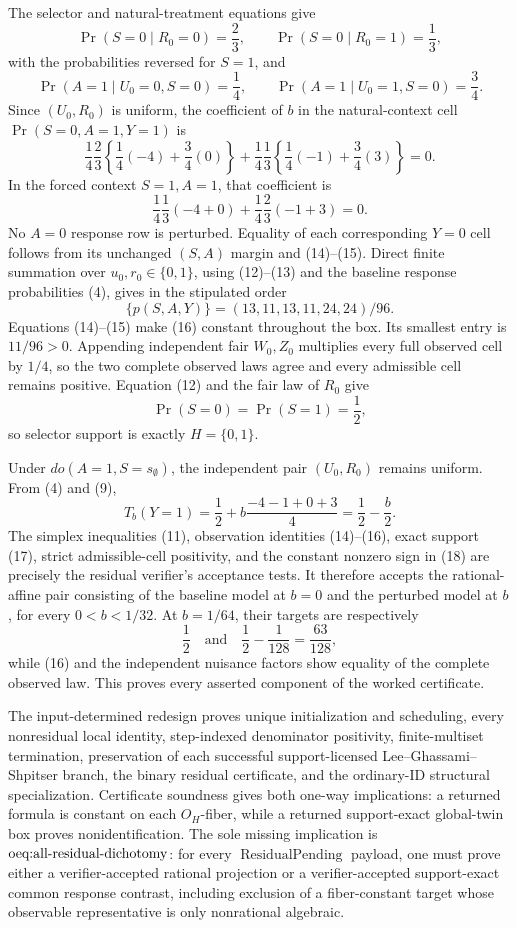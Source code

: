 The selector and natural-treatment equations give
\[
 \Pr(S=0\mid R_0=0)=\frac23,
 \qquad
 \Pr(S=0\mid R_0=1)=\frac13,
\tag{12}
\]
with the probabilities reversed for \(S=1\), and
\[
 \Pr(A=1\mid U_0=0,S=0)=\frac14,
 \qquad
 \Pr(A=1\mid U_0=1,S=0)=\frac34.
\tag{13}
\]
Since \((U_0,R_0)\) is uniform, the coefficient of \(b\) in the natural-context cell \(\Pr(S=0,A=1,Y=1)\) is
\[
 \frac14\frac23\left\{\frac14(-4)+\frac34(0)\right\}
 +\frac14\frac13\left\{\frac14(-1)+\frac34(3)\right\}=0.
\tag{14}
\]
In the forced context \(S=1,A=1\), that coefficient is
\[
 \frac14\frac13(-4+0)+\frac14\frac23(-1+3)=0.
\tag{15}
\]
No \(A=0\) response row is perturbed.  Equality of each corresponding \(Y=0\) cell follows from its unchanged \((S,A)\) margin and (14)--(15).  Direct finite summation over \(u_0,r_0\in\{0,1\}\), using (12)--(13) and the baseline response probabilities (4), gives in the stipulated order
\[
 \bigl\{p(S,A,Y)\bigr\}
 =(13,11,13,11,24,24)/96.
\tag{16}
\]
Equations (14)--(15) make (16) constant throughout the box.  Its smallest entry is \(11/96>0\).  Appending independent fair \(W_0,Z_0\) multiplies every full observed cell by \(1/4\), so the two complete observed laws agree and every admissible cell remains positive.  Equation (12) and the fair law of \(R_0\) give
\[
 \Pr(S=0)=\Pr(S=1)=\frac12,
\tag{17}
\]
so selector support is exactly \(H=\{0,1\}\).

Under \(do(A=1,S=s_{\emptyset})\), the independent pair \((U_0,R_0)\) remains uniform.  From (4) and (9),
\[
 T_b(Y=1)=\frac12+b\frac{-4-1+0+3}{4}
 =\frac12-\frac b2.
\tag{18}
\]
The simplex inequalities (11), observation identities (14)--(16), exact support (17), strict admissible-cell positivity, and the constant nonzero sign in (18) are precisely the residual verifier's acceptance tests.  It therefore accepts the rational-affine pair consisting of the baseline model at \(b=0\) and the perturbed model at \(b\), for every \(0<b<1/32\).  At \(b=1/64\), their targets are respectively
\[
 \frac12
 \quad\text{and}\quad
 \frac12-\frac1{128}=\frac{63}{128},
\tag{19}
\]
while (16) and the independent nuisance factors show equality of the complete observed law.  This proves every asserted component of the worked certificate.

The input-determined redesign proves unique initialization and scheduling, every nonresidual local identity, step-indexed denominator positivity, finite-multiset termination, preservation of each successful support-licensed Lee--Ghassami--Shpitser branch, the binary residual certificate, and the ordinary-ID structural specialization.  Certificate soundness gives both one-way implications: a returned formula is constant on each \(O_H\)-fiber, while a returned support-exact global-twin box proves nonidentification.  The sole missing implication is \(\textnormal{oeq:all-residual-dichotomy}\): for every \(\operatorname{ResidualPending}\) payload, one must prove either a verifier-accepted rational projection or a verifier-accepted support-exact common response contrast, including exclusion of a fiber-constant target whose observable representative is only nonrational algebraic.
